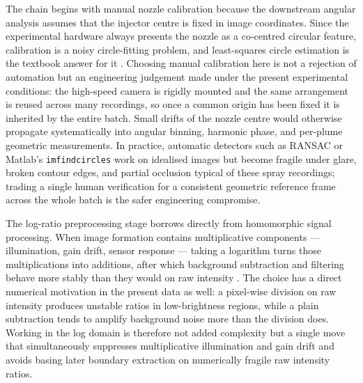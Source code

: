 \documentclass[english, 12pt, a4paper, elec, utf8, a-2b, online]{aaltothesis}
\begin{document}
The chain begins with manual nozzle calibration because the downstream angular analysis assumes that the injector centre is fixed in image coordinates.
Since the experimental hardware always presents the nozzle as a co-centred circular feature,
calibration is a noisy circle-fitting problem, and least-squares circle estimation is the textbook answer for it
\cite{Pratt1987CircleFit,Taubin1991CircleFit}.
Choosing manual calibration here is not a rejection of automation but an engineering judgement made under the present experimental conditions:
the high-speed camera is rigidly mounted and the same arrangement is reused across many recordings,
so once a common origin has been fixed it is inherited by the entire batch.
Small drifts of the nozzle centre would otherwise propagate systematically into angular binning, harmonic phase, and per-plume geometric measurements.
In practice, automatic detectors such as RANSAC or Matlab's \texttt{imfindcircles} work on idealised images
but become fragile under glare, broken contour edges, and partial occlusion typical of these spray recordings;
trading a single human verification for a consistent geometric reference frame across the whole batch is the safer engineering compromise.

The log-ratio preprocessing stage borrows directly from homomorphic signal processing.
When image formation contains multiplicative components --- illumination, gain drift, sensor response ---
taking a logarithm turns those multiplications into additions,
after which background subtraction and filtering behave more stably than they would on raw intensity
\cite{OppenheimSchaferStockham1968,GonzalezWoodsDIP}.
The choice has a direct numerical motivation in the present data as well:
a pixel-wise division on raw intensity produces unstable ratios in low-brightness regions,
while a plain subtraction tends to amplify background noise more than the division does.
Working in the log domain is therefore not added complexity but a single move that simultaneously suppresses multiplicative illumination and gain drift
and avoids basing later boundary extraction on numerically fragile raw intensity ratios.
\end{document}
